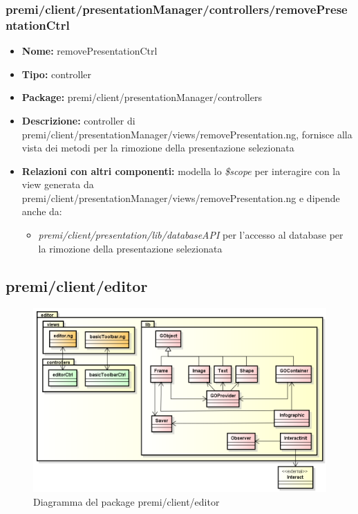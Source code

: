 \subsubsection{premi/client/presentationManager/controllers/removePresentationCtrl}
\begin{itemize}
  \item[] \textbf{Nome:} removePresentationCtrl
  \item[] \textbf{Tipo:} controller
  \item[] \textbf{Package:} premi/client/presentationManager/controllers
  \item[] \textbf{Descrizione:} controller di premi/client/presentationManager/views/removePresentation.ng, fornisce alla vista dei metodi per la rimozione della presentazione selezionata
  \item[] \textbf{Relazioni con altri componenti:} modella lo \textit{\$scope} per interagire con la view generata da premi/client/presentationManager/views/removePresentation.ng e dipende anche da:
 \begin{itemize}
 \item \textit{premi/client/presentation/lib/databaseAPI} per l'accesso al database per la rimozione della presentazione selezionata
\end{itemize}
\end{itemize}



\clearpage
\subsection{premi/client/editor}
\begin{figure}[!h]
\begin{center}
\includegraphics[scale=0.50]{img/diapkg/editor.png}
\caption{Diagramma del package premi/client/editor}
\end{center}
\end{figure}
